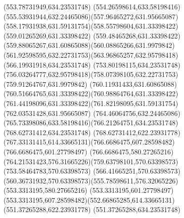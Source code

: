 {{		\closepath
		\moveto(553.78731949,634.23531748)
		\curveto(554.26598614,633.58198416)(555.53931944,632.24465086)(557.96465272,631.95665087)
		\curveto(558.17931938,631.59131754)(558.55798604,631.33398422)(559.01265269,631.33398422)
		\curveto(559.48465268,631.33398422)(559.88065267,631.60865088)(560.08865266,631.9979842)
		\curveto(561.92598595,632.22731753)(563.96865257,632.95798418)(566.19931918,634.23531748)
		\lineto(753.80198115,634.23531748)
		\curveto(756.03264777,632.95798418)(758.07398105,632.22731753)(759.91264767,631.9979842)
		\curveto(760.11931433,631.60865088)(760.51664765,631.33398422)(760.98864764,631.33398422)
		\curveto(761.44198096,631.33398422)(761.82198095,631.59131754)(762.03531428,631.95665087)
		\curveto(764.46064756,632.24465086)(765.73398086,633.58198416)(766.21264751,634.23531748)
		\lineto(768.62731412,634.23531748)
		\lineto(768.62731412,622.23931778)
		\curveto(767.33131415,614.33665131)(766.6686475,607.28598482)(766.6686475,601.27798497)
		\lineto(766.6686475,580.27265216)
		\curveto(764.21531423,576.31665226)(759.63798101,570.63398573)(753.58464783,570.63398573)
		\lineto(566.41665251,570.63398573)
		\curveto(560.36731932,570.63398573)(555.78598611,576.32065226)(553.3313195,580.27665216)
		\lineto(553.3313195,601.27798497)
		\curveto(553.3313195,607.28598482)(552.66865285,614.33665131)(551.37265288,622.23931778)
		\lineto(551.37265288,634.23531748)
		\closepath
	}
}